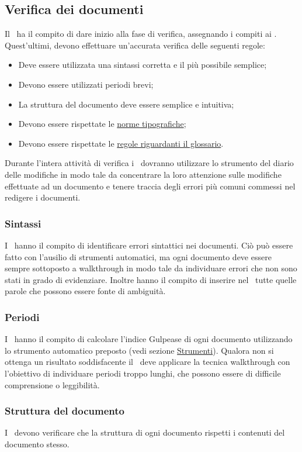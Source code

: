 \documentclass[../NormeProgetto.tex]{subfiles}
\begin{document}
		\subsection{Verifica dei documenti}
		Il \responsabilediprogetto\ ha il compito di dare inizio alla fase di verifica, assegnando i compiti ai \verificatori. Quest'ultimi, devono effettuare un'accurata verifica delle seguenti regole:
		\begin{itemize}
			\item Deve essere utilizzata una sintassi corretta e il più possibile semplice;
			\item Devono essere utilizzati periodi brevi;
			\item La struttura del documento deve essere semplice e intuitiva;
			\item Devono essere rispettate le  \hyperref[sec:Norme tipografiche]{norme tipografiche};
			\item Devono essere rispettate le \hyperref[sec:Glossario]{regole riguardanti il glossario}.
		\end{itemize}
		Durante l'intera attività di verifica i \verificatori\ dovranno utilizzare lo strumento del diario delle modifiche in modo tale da concentrare la loro attenzione sulle modifiche effettuate ad un documento e tenere traccia degli errori più comuni commessi nel redigere i documenti.
			\subsubsection{Sintassi}
			I \verificatori\ hanno il compito di identificare errori sintattici nei documenti. Ciò può essere fatto con l'ausilio di strumenti automatici, ma ogni documento deve essere sempre sottoposto a walkthrough in modo tale da individuare errori che non sono stati in grado di evidenziare. Inoltre hanno il compito di inserire nel \glossario\ tutte quelle parole che possono essere fonte di ambiguità.
			\subsubsection{Periodi}
			I \verificatori\ hanno il compito di calcolare l’indice Gulpease di ogni documento utilizzando lo strumento automatico preposto (vedi sezione \hyperref[sec:Strumenti]{Strumenti}). Qualora non si ottenga un risultato soddisfacente il \verificatore\ deve applicare la tecnica walkthrough con l'obiettivo di individuare periodi troppo lunghi, che possono essere di difficile comprensione o leggibilità.
			\subsubsection{Struttura del documento}
			I \verificatori\ devono verificare che la struttura di ogni documento rispetti i contenuti del documento stesso.
\end{document}
